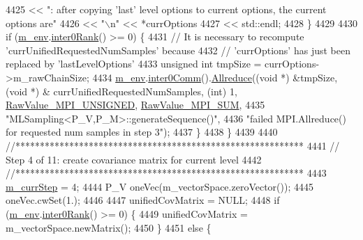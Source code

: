 \begin{DoxyCode}
{{4425                                 << \textcolor{stringliteral}{": after copying 'last' level options to current options, the current
       options are"}
4426                                 << \textcolor{stringliteral}{"\(\backslash\)n"} << *currOptions
4427                                 << std::endl;
4428       \}
4429 
4430       \textcolor{keywordflow}{if} (\hyperlink{class_q_u_e_s_o_1_1_m_l_sampling_a13f1ca4fe9f94822fe572a743eaced1d}{m\_env}.\hyperlink{class_q_u_e_s_o_1_1_base_environment_ae106b5bb8a80b655b88b3a26b1e7c185}{inter0Rank}() >= 0) \{
4431         \textcolor{comment}{// It is necessary to recompute 'currUnifiedRequestedNumSamples' because}
4432         \textcolor{comment}{// 'currOptions' has just been replaced by 'lastLevelOptions'}
4433         \textcolor{keywordtype}{unsigned} \textcolor{keywordtype}{int} tmpSize = currOptions->m\_rawChainSize;
4434         \hyperlink{class_q_u_e_s_o_1_1_m_l_sampling_a13f1ca4fe9f94822fe572a743eaced1d}{m\_env}.\hyperlink{class_q_u_e_s_o_1_1_base_environment_a689e4d140c74d495d97eb498714a4b82}{inter0Comm}().\hyperlink{class_q_u_e_s_o_1_1_mpi_comm_a72e137e60ef8060efb1ee5fc874fa4b8}{Allreduce}((\textcolor{keywordtype}{void} *) &tmpSize, (\textcolor{keywordtype}{void} *) &
      currUnifiedRequestedNumSamples, (\textcolor{keywordtype}{int}) 1, \hyperlink{_mpi_comm_8h_a06cbfbc33436f6e0dc8a48ff3c49bdfc}{RawValue\_MPI\_UNSIGNED}, 
      \hyperlink{_mpi_comm_8h_afbf78d291c032aa7f512bc566cee2bd1}{RawValue\_MPI\_SUM},
4435                                      \textcolor{stringliteral}{"MLSampling<P\_V,P\_M>::generateSequence()"},
4436                                      \textcolor{stringliteral}{"failed MPI.Allreduce() for requested num samples in step 3"});
4437       \}
4438     \}
4439 
4440     \textcolor{comment}{//***********************************************************}
4441     \textcolor{comment}{// Step 4 of 11: create covariance matrix for current level}
4442     \textcolor{comment}{//***********************************************************}
4443     \hyperlink{class_q_u_e_s_o_1_1_m_l_sampling_a1b1f8ccb4823bdfa26ec652f0807c63e}{m\_currStep} = 4;
4444     P\_V oneVec(m\_vectorSpace.zeroVector());
4445     oneVec.cwSet(1.);
4446 
4447     unifiedCovMatrix = NULL;
4448     \textcolor{keywordflow}{if} (\hyperlink{class_q_u_e_s_o_1_1_m_l_sampling_a13f1ca4fe9f94822fe572a743eaced1d}{m\_env}.\hyperlink{class_q_u_e_s_o_1_1_base_environment_ae106b5bb8a80b655b88b3a26b1e7c185}{inter0Rank}() >= 0) \{
4449       unifiedCovMatrix = m\_vectorSpace.newMatrix();
4450     \}
4451     \textcolor{keywordflow}{else} \{
}}
\end{DoxyCode}
